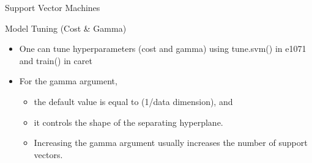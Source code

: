 \documentclass[ignorenonframetext,]{beamer}
\newenvironment{Shaded}{\begin{snugshade}}{\end{snugshade}}
\newcommand{\KeywordTok}[1]{\textcolor[rgb]{0.13,0.29,0.53}{\textbf{#1}}}
\newcommand{\DataTypeTok}[1]{\textcolor[rgb]{0.13,0.29,0.53}{#1}}
\newcommand{\DecValTok}[1]{\textcolor[rgb]{0.00,0.00,0.81}{#1}}
\newcommand{\StringTok}[1]{\textcolor[rgb]{0.31,0.60,0.02}{#1}}
\newcommand{\OperatorTok}[1]{\textcolor[rgb]{0.81,0.36,0.00}{\textbf{#1}}}
\newcommand{\NormalTok}[1]{#1}
\providecommand{\tightlist}{%
  \setlength{\itemsep}{0pt}\setlength{\parskip}{0pt}}
\begin{document}
\begin{frame}[fragile]{Support Vector Machines}

\begin{block}{Model Tuning (Cost \& Gamma)}

\begin{itemize}
\item
  One can tune hyperparameters (cost and gamma) using tune.svm() in
  e1071 and train() in caret
\item
  For the gamma argument,

  \begin{itemize}
  \tightlist
  \item
    the default value is equal to (1/data dimension), and
  \item
    it controls the shape of the separating hyperplane.
  \item
    Increasing the gamma argument usually increases the number of
    support vectors.
  \end{itemize}
\end{itemize}

\begin{Shaded}
\end{Shaded}

\end{block}

\end{frame}
\end{document}
